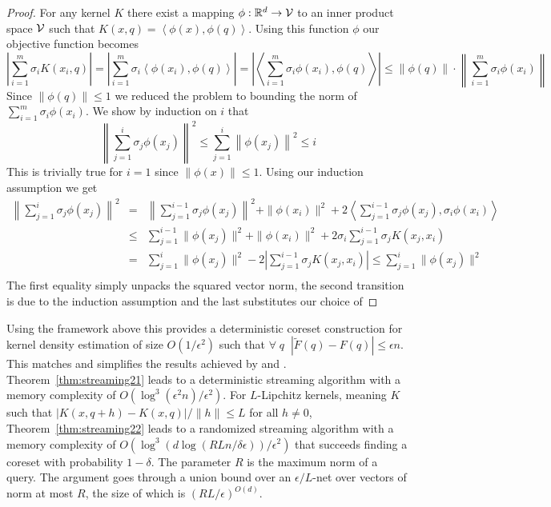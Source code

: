 \documentclass[anon,12pt]{colt2019} %
\newcommand{\ip}[1]{\left \langle #1 \right \rangle}
\newcommand{\R}{\mathbb{R}}
\newcommand{\eps}{\epsilon}
\begin{document}
{\begin{proof}
For any kernel $K$ there exist a mapping $\phi: \R^d \to {\cal V}$ to an inner product space $\cal V$ such that 
$ K(x,q) = \ip{\phi(x), \phi(q)} $.
Using this function $\phi$ our objective function becomes
\[
|\sum_{i=1}^m \sigma_i K(x_i,q)| = |\sum_{i=1}^m \sigma_i \ip{\phi(x_i), \phi(q)} | = \left| \ip{ \sum_{i=1}^m \sigma_i \phi(x_i), \phi(q)}\right| \leq  \|\phi(q)\| \cdot \left\|  \sum_{i=1}^m \sigma_i \phi(x_i) \right\| 
\]
Since $\|\phi(q)\| \leq 1$ we reduced the problem to bounding the norm of $ \sum_{i=1}^m \sigma_i \phi(x_i) $.
%
We show by induction on $i$ that 
$$\left\| \sum_{j=1}^i \sigma_j \phi(x_j) \right\|^2 \le \sum_{j=1}^i \left\|\phi(x_j)\right\|^2 \leq i$$
This is trivially true for $i=1$ since $\|\phi(x)\| \leq 1$. 
Using our induction assumption we get
\begin{eqnarray*}
\left\| \sum_{j=1}^{i}\sigma_j \phi(x_j)\right\|^2 &=& \left\|\sum_{j=1}^{i-1}\sigma_j \phi(x_j)\right\|^2 + \|\phi(x_i)\|^2 + 2\ip{ \sum_{j=1}^{i-1}\sigma_j \phi(x_j), \sigma_i \phi(x_i)} \\
&\le& \sum_{j=1}^{i-1} \|\phi(x_j)\|^2 + \|\phi(x_i)\|^2 + 2\sigma_i \sum_{j=1}^{i-1}\sigma_j K(x_j, x_i)\\
&=& \sum_{j=1}^{i} \|\phi(x_j)\|^2 - 2\left| \sum_{j=1}^{i-1}\sigma_j K(x_j, x_i) \right| \le \sum_{j=1}^{i} \|\phi(x_j)\|^2 \\
\end{eqnarray*}
The first equality simply unpacks the squared vector norm, the second transition is due to the induction assumption and the last substitutes our choice of %
\end{proof}

Using the framework above this provides a deterministic coreset construction for kernel density estimation of size $O(1/\eps^2)$ such that $\forall \;q\;\; |\tilde F(q) - F(q)| \le \eps n$. This matches and simplifies the results achieved by \cite{DBLP:conf/soda/PhillipsT18} and \cite{DBLP:journals/corr/abs-1802-01751}. Theorem~\ref{thm:streaming21} leads to a deterministic streaming algorithm with a memory complexity of $O(\log^3(\eps^2 n)/\eps^2)$. For $L$-Lipchitz kernels, meaning $K$ such that $|K(x,q+h) - K(x,q)|/\|h\| \leq L$ for all $h \neq 0$, Theorem~\ref{thm:streaming22} leads to a randomized streaming algorithm with a memory complexity of $O\left(\log^3 \left( d \log\left(RLn/\delta\eps\right) \right) / \eps^2 \right)$ that succeeds finding a coreset with probability $1-\delta$. The parameter $R$ is the maximum norm of a query. The argument goes through a union bound over an $\eps/L$-net over vectors of norm at most $R$, the size of which is $(RL/\eps)^{O(d)}$.

}
\end{document}
